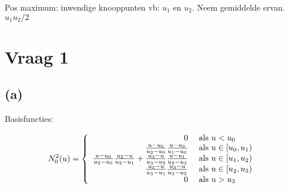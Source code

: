 \documentclass[10pt,a4paper]{article}
\begin{document}
Pos maximum: inwendige knooppunten vb: $u_1$ en $u_2$. Neem gemiddelde ervan. $u_1u_2/2$
\section{Vraag 1}
\subsection*{(a)}
Basisfuncties:\\
\newcommand{\grid}[2]{
\draw[->] (0,0) -- (5,0) node[anchor=north] {$u$};
\draw[->] (0,0) -- (0,1.5) node[anchor=east] {$N_{#1}^{#2}(u)$};

\draw	(1,0) node[anchor=north] {$u_0$}
		(2,0) node[anchor=north] {$u_1$}
		(3,0) node[anchor=north] {$u_2$}
		(4,0) node[anchor=north] {$u_3$};
\draw	(0,0)   node[anchor=east] {$0$}
		(0,0.5) node[anchor=east] {$0.5$}
		(0,1)   node[anchor=east] {$1$};
}
\newcommand{\nzero}[1]{
\draw[thick] (0,0) -- (1+#1,0);
\draw[thick] (1+#1,1) -- (2+#1,1);
\draw[thick] (2+#1,0) -- (5,0);

\draw[fill=black] (1+#1,1) circle (0.5mm);
\draw[fill=black] (2+#1,1) circle (0.5mm);
\draw[fill=white] (1+#1,0) circle (0.5mm);
\draw[fill=white] (2+#1,0) circle (0.5mm);
}
\newcommand{\none}[1]{
\draw[thick] (0,0) -- (1+#1,0);
\draw[thick] (1+#1,0) -- (2+#1,1) -- (3+#1,0);
\draw[thick] (3+#1,0) -- (5,0);
}
\newcommand{\ntwo}{
\draw[scale=1,domain=1:2,smooth,variable=\u, thick] plot( {\u},{0.5*(\u-1)*(\u-1)});
\draw[scale=1,domain=2:3,smooth,variable=\u, thick] plot( {\u},{0.5*(-3+6*(\u-1)- 2*(\u-1)*(\u-1)))});
\draw[scale=1,domain=3:4,smooth,variable=\u, thick] plot( {\u},{0.5*(4-\u)*(4-\u)});
}
\[
N_{0}^{2}(u) =
\left\{
\begin{array}{r l}
0 &\text{ als } u < u_0\\
  \frac{u-u_0}{u_2-u_0}\frac{u-u_0}{u_1-u_0} &\text{ als } u \in [u_0,u_1)\\
  \frac{u-u_0}{u_2-u_0}\frac{u_2-u}{u_2-u_1} + \frac{u_3-u}{u_3-u_2}\frac{u-u_1}{u_2-u_3} &\text{ als } u \in [u_1,u_2)\\
  \frac{u_3-u}{u_3-u_1}\frac{u_3-u}{u_3-u_2} &\text{ als } u \in [u_2,u_3)\\
0 &\text{ als } u > u_3\\
\end{array}
\right.
\]
\end{document}
